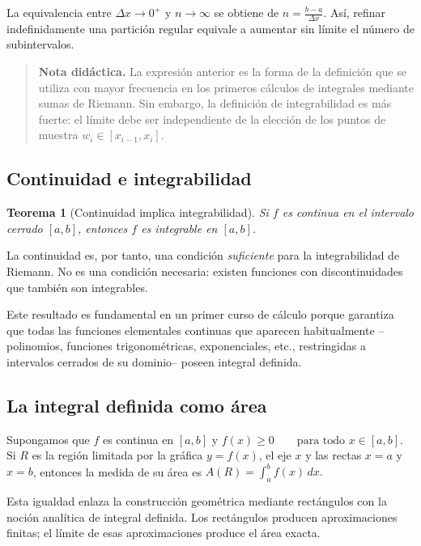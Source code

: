 \documentclass[12pt]{article}
\newtheorem{Teo}{Teorema}
\begin{document}
La equivalencia entre $\Delta x\to0^+$ y $n\to\infty$ se obtiene de
$
n=\frac{b-a}{\Delta x}.
$
Así, refinar indefinidamente una partición regular equivale a aumentar sin
límite el número de subintervalos.

\begin{quote}
\textbf{Nota didáctica.} La expresión anterior es la forma de la definición que
se utiliza con mayor frecuencia en los primeros cálculos de integrales mediante
sumas de Riemann. Sin embargo, la definición de integrabilidad es más fuerte:
el límite debe ser independiente de la elección de los puntos de muestra
$w_i\in[x_{i-1},x_i]$.
\end{quote}
\subsection*{Continuidad e integrabilidad}
\begin{Teo}[Continuidad implica integrabilidad]
Si $f$ es continua en el intervalo cerrado $[a,b]$, entonces $f$ es integrable
en $[a,b]$.
\end{Teo}

La continuidad es, por tanto, una condición \emph{suficiente} para la
integrabilidad de Riemann. No es una condición necesaria: existen funciones
con discontinuidades que también son integrables.

Este resultado es fundamental en un primer curso de cálculo porque garantiza
que todas las funciones elementales continuas que aparecen habitualmente
--polinomios, funciones trigonométricas, exponenciales, etc., restringidas a
intervalos cerrados de su dominio-- poseen integral definida.
\subsection*{La integral definida como área}
Supongamos que $f$ es continua en $[a,b]$ y
$
f(x)\geq0\qquad\text{para todo }x\in[a,b].
$
Si $R$ es la región limitada por la gráfica $y=f(x)$, el eje $x$ y las rectas
$x=a$ y $x=b$, entonces la medida de su área es
$
\boxed{
A(R)=\int_a^b f(x)\,dx.
}
$

Esta igualdad enlaza la construcción geométrica mediante rectángulos con la
noción analítica de integral definida. Los rectángulos producen aproximaciones
finitas; el límite de esas aproximaciones produce el área exacta.
\end{document}
